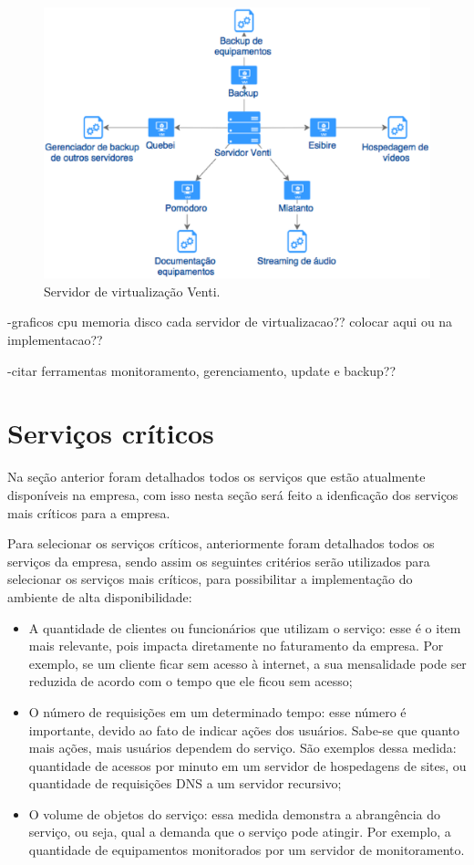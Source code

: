 \begin{figure}[h!]
 \centering
 \includegraphics[width=430px]{img/serv_venti.eps}
 \caption{Servidor de virtualização Venti.}
 \label{fig:serv_venti}
\end{figure}

-graficos cpu memoria disco cada servidor de virtualizacao?? colocar aqui ou na implementacao??

-citar ferramentas monitoramento, gerenciamento, update e backup??

\section{Serviços críticos}
\label{section:servcrit}

Na seção anterior foram detalhados todos os serviços que estão atualmente disponíveis na empresa, com isso nesta seção será feito a 
idenficação dos serviços mais críticos para a empresa.

Para selecionar os serviços críticos, anteriormente foram detalhados todos os serviços da empresa, sendo assim os seguintes critérios serão 
utilizados para selecionar os serviços mais críticos, para possibilitar a implementação do ambiente de alta disponibilidade: 
\begin{itemize}
 \item A quantidade de clientes ou funcionários que utilizam o serviço: esse é o item mais relevante, pois impacta diretamente no faturamento
 da empresa. Por exemplo, se um cliente ficar sem acesso à internet, a sua mensalidade pode ser reduzida de acordo com o tempo que ele ficou
 sem acesso; 
 \item O número de requisições em um determinado tempo: esse número é importante, devido ao fato de indicar ações dos usuários. Sabe-se que
 quanto mais ações, mais usuários dependem do serviço. São exemplos dessa medida: quantidade de acessos por minuto em um servidor de hospedagens 
 de sites, ou quantidade de requisições \ac{DNS} a um servidor recursivo;
 \item O volume de objetos do serviço: essa medida demonstra a abrangência do serviço, ou seja, qual a demanda que o serviço pode atingir.
 Por exemplo, a quantidade de equipamentos monitorados por um servidor de monitoramento.
\end{itemize}

